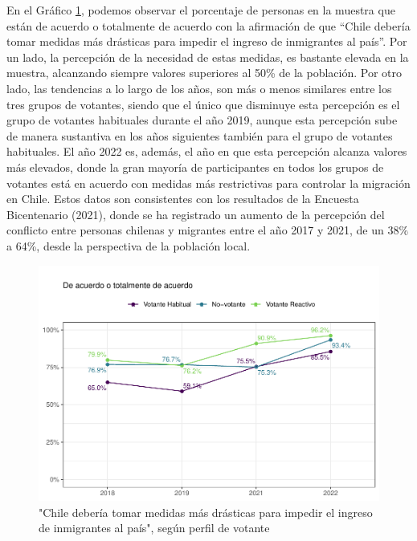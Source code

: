 \documentclass[
  12pt,
]{book}
\begin{document}
En el Gráfico \ref{fig:graf-medidas-inm}, podemos observar el porcentaje de personas en la muestra que están de acuerdo o totalmente de acuerdo con la afirmación de que ``Chile debería tomar medidas más drásticas para impedir el ingreso de inmigrantes al país''. Por un lado, la percepción de la necesidad de estas medidas, es bastante elevada en la muestra, alcanzando siempre valores superiores al 50\% de la población. Por otro lado, las tendencias a lo largo de los años, son más o menos similares entre los tres grupos de votantes, siendo que el único que disminuye esta percepción es el grupo de votantes habituales durante el año 2019, aunque esta percepción sube de manera sustantiva en los años siguientes también para el grupo de votantes habituales. El año 2022 es, además, el año en que esta percepción alcanza valores más elevados, donde la gran mayoría de participantes en todos los grupos de votantes está en acuerdo con medidas más restrictivas para controlar la migración en Chile. Estos datos son consistentes con los resultados de la Encuesta Bicentenario (2021), donde se ha registrado un aumento de la percepción del conflicto entre personas chilenas y migrantes entre el año 2017 y 2021, de un 38\% a 64\%, desde la perspectiva de la población local.

\begin{figure}

{\centering \includegraphics{reporte-elsoc_files/figure-latex/graf-medidas-inm-1} 

}

\caption{"Chile debería tomar medidas más
drásticas para impedir el ingreso
de inmigrantes al país", según perfil de votante}\label{fig:graf-medidas-inm}
\end{figure}
\end{document}
